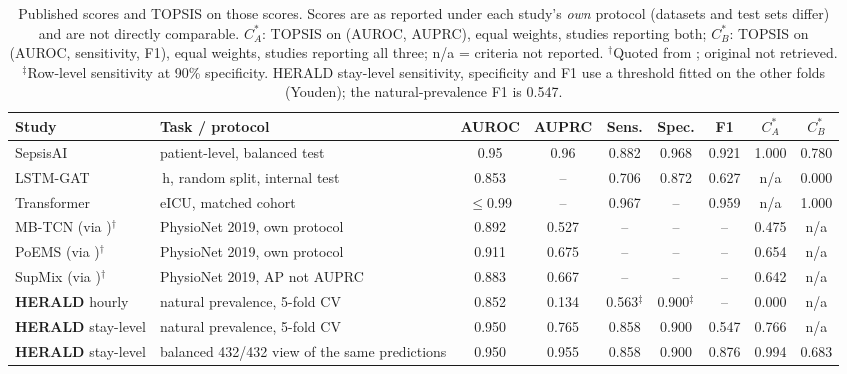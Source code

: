 \begin{table}[!t]
\centering\scriptsize\setlength{\tabcolsep}{3pt}
\caption{Published scores and TOPSIS on those scores. Scores are as reported under each study's \emph{own} protocol (datasets and test sets differ) and are not directly comparable. $C^*_A$: TOPSIS on (AUROC, AUPRC), equal weights, studies reporting both; $C^*_B$: TOPSIS on (AUROC, sensitivity, F1), equal weights, studies reporting all three; n/a = criteria not reported. $^\dagger$Quoted from \cite{mansoor2026}; original not retrieved. $^\ddagger$Row-level sensitivity at 90\% specificity. HERALD stay-level sensitivity, specificity and F1 use a threshold fitted on the other folds (Youden); the natural-prevalence F1 is 0.547.}
\label{tab:lit_scores}
\begin{adjustbox}{max width=\linewidth}
\begin{tabular}{>{\raggedright\arraybackslash}p{3.0cm}>{\raggedright\arraybackslash}p{3.6cm}ccccccc}
\toprule
Study & Task / protocol & AUROC & AUPRC & Sens. & Spec. & F1 & $C^*_A$ & $C^*_B$ \\
\midrule
SepsisAI \cite{gupta2024} & patient-level, balanced test & 0.95 & 0.96 & 0.882 & 0.968 & 0.921 & 1.000 & 0.780 \\
LSTM-GAT \cite{khorram2026} & 12\,h, random split, internal test & 0.853 & -- & 0.706 & 0.872 & 0.627 & n/a & 0.000 \\
Transformer \cite{tang2024} & eICU, matched cohort & $\le$0.99 & -- & 0.967 & -- & 0.959 & n/a & 1.000 \\
MB-TCN (via \cite{mansoor2026})$^\dagger$ & PhysioNet 2019, own protocol & 0.892 & 0.527 & -- & -- & -- & 0.475 & n/a \\
PoEMS (via \cite{mansoor2026})$^\dagger$ & PhysioNet 2019, own protocol & 0.911 & 0.675 & -- & -- & -- & 0.654 & n/a \\
SupMix (via \cite{mansoor2026})$^\dagger$ & PhysioNet 2019, AP not AUPRC & 0.883 & 0.667 & -- & -- & -- & 0.642 & n/a \\
\midrule
\textbf{HERALD} hourly & natural prevalence, 5-fold CV & 0.852 & 0.134 & 0.563$^\ddagger$ & 0.900$^\ddagger$ & -- & 0.000 & n/a \\
\textbf{HERALD} stay-level & natural prevalence, 5-fold CV & 0.950 & 0.765 & 0.858 & 0.900 & 0.547 & 0.766 & n/a \\
\textbf{HERALD} stay-level & balanced 432/432 view of the same predictions & 0.950 & 0.955 & 0.858 & 0.900 & 0.876 & 0.994 & 0.683 \\
\bottomrule
\end{tabular}
\end{adjustbox}
\end{table}
